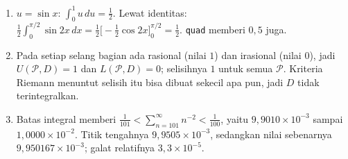 \begin{enumerate}[label=\textbf{13.\arabic*}]
  \item $u=\sin x$: $\int_{0}^{1}u\,du=\tfrac12$. Lewat identitas:
        $\tfrac12\int_{0}^{\pi/2}\sin2x\,dx
        =\tfrac12\bigl[-\tfrac12\cos2x\bigr]_{0}^{\pi/2}=\tfrac12$. \texttt{quad}
        memberi $0{,}5$ juga.

  \item Pada setiap selang bagian ada rasional (nilai $1$) dan irasional (nilai
        $0$), jadi $U(\mathcal{P},D)=1$ dan $L(\mathcal{P},D)=0$; selisihnya $1$
        untuk semua $\mathcal{P}$. Kriteria Riemann menuntut selisih itu bisa
        dibuat sekecil apa pun, jadi $D$ tidak terintegralkan.

  \item Batas integral memberi $\frac1{101}<\sum_{n=101}^{\infty}n^{-2}
        <\frac1{100}$, yaitu $9{,}9010\times10^{-3}$ sampai
        $1{,}0000\times10^{-2}$. Titik tengahnya $9{,}9505\times10^{-3}$,
        sedangkan nilai sebenarnya $9{,}950167\times10^{-3}$; galat relatifnya
        $3{,}3\times10^{-5}$.
\end{enumerate}

